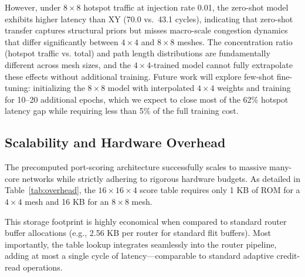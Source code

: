 However, under $8\times8$ hotspot traffic at injection rate 0.01, the zero-shot model exhibits higher latency than XY (70.0 vs.~43.1 cycles), indicating that zero-shot transfer captures structural priors but misses macro-scale congestion dynamics that differ significantly between $4\times4$ and $8\times8$ meshes. The concentration ratio (hotspot traffic vs. total) and path length distributions are fundamentally different across mesh sizes, and the $4\times4$-trained model cannot fully extrapolate these effects without additional training. Future work will explore few-shot fine-tuning: initializing the $8\times8$ model with interpolated $4\times4$ weights and training for 10--20 additional epochs, which we expect to close most of the 62\% hotspot latency gap while requiring less than 5\% of the full training cost.

\subsection{Scalability and Hardware Overhead}

The precomputed port-scoring architecture successfully scales to massive many-core networks while strictly adhering to rigorous hardware budgets. As detailed in Table~\ref{tab:overhead}, the $16\times16\times4$ score table requires only 1 KB of ROM for a $4\times4$ mesh and 16 KB for an $8\times8$ mesh.

\begin{table}[h]
\centering
\caption{Overhead analysis of GNN-based routing across mesh sizes}
\label{tab:overhead}
\end{table}

This storage footprint is highly economical when compared to standard router buffer allocations (e.g., 2.56 KB per router for standard flit buffers). Most importantly, the table lookup integrates seamlessly into the router pipeline, adding at most a single cycle of latency---comparable to standard adaptive credit-read operations.

